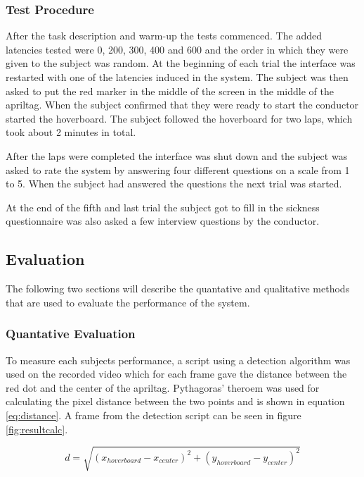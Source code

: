 \documentclass[nofilelist]{cslthse-msc}
\begin{document}
\subsubsection{Test Procedure}
After the task description and warm-up the tests commenced. The added latencies tested were 0, 200, 300, 400 and 600 and the order in which they were given to the subject was random. 
At the beginning of each trial the interface was restarted with one of the latencies induced in the system. The subject was then asked to put the red marker in the middle of the screen in the middle of the apriltag. When the subject confirmed that they were ready to start the conductor started the hoverboard. The subject followed the hoverboard for two laps, which took about 2 minutes in total.

After the laps were completed the interface was shut down and the subject was asked to rate the system by answering four different questions on a scale from 1 to 5. When the subject had answered the questions the next trial was started.

At the end of the fifth and last trial the subject got to fill in the sickness questionnaire was also asked a few interview questions by the conductor.

\subsection{Evaluation}
The following two sections will describe the quantative and qualitative methods that are used to evaluate the performance of the system.

\subsubsection{Quantative Evaluation}
To measure each subjects performance, a script using a detection algorithm was used on the recorded video which for each frame gave the distance between the red dot and the center of the apriltag. Pythagoras' theroem was used for calculating the pixel distance between the two points and is shown in equation \ref{eq:distance}. A frame from the detection script can be seen in figure \ref{fig:resultcalc}.


\begin{equation}
   \label{eq:distance}
   d = \sqrt{(x_{hoverboard} - x_{center})^2 + (y_{hoverboard} - y_{center})^2}
\end{equation}
\end{document}

